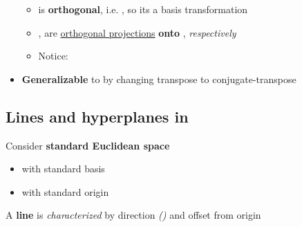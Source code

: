 \begin{itemize}
            \begin{itemize}

                  \item
                         is \textbf{orthogonal}, i.e. , so
                        its a basis transformation
                  \item
                        ,
                        are \underline{orthogonal projections} \textbf{onto} ,
                         \emph{respectively}
                  \item
                        Notice:
            \end{itemize}
      \item
            \textbf{Generalizable} to  by
            changing transpose to conjugate-transpose
\end{itemize}

\subsection*{\texorpdfstring{Lines and hyperplanes in }{Lines and hyperplanes in}}

Consider \textbf{standard Euclidean space}

\begin{itemize}

      \item
            with standard basis
      \item
            with standard origin 
\end{itemize}

\hSep %

A \textbf{line}  is
\emph{characterized} by direction 
\emph{()} and offset from origin 

